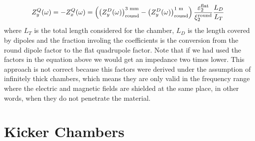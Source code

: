     \begin{align}
        Z_y^Q(\omega) = -Z_x^Q(\omega) =
            \left(\left(Z_y^D(\omega)\right)_{\text{round}}^\text{3 mm} -
                    \left(Z_y^D(\omega)\right)_{\text{round}}^\text{1 m}\right)
            \frac{\varepsilon_2^{\text{flat}}}{\xi_2^{\text{round}}} \frac{L_D}{L_T}
    \end{align}
    where $L_T$ is the total length considered for the chamber, $L_D$ is the length covered by dipoles and the fraction involing the \citeauthor{Laslett1963} coefficients is the conversion from the round dipole factor to the flat quadrupole factor. Note that if we had used the \citeauthor{Yokoya1993} factors in the equation above we would get an impedance two times lower. This approach is not correct because this factors were derived under the assumption of infinitely thick chambers, which means they are only valid in the frequency range where the electric and magnetic fields are shielded at the same place, in other words, when they do not penetrate the material.

\section{Kicker Chambers}

